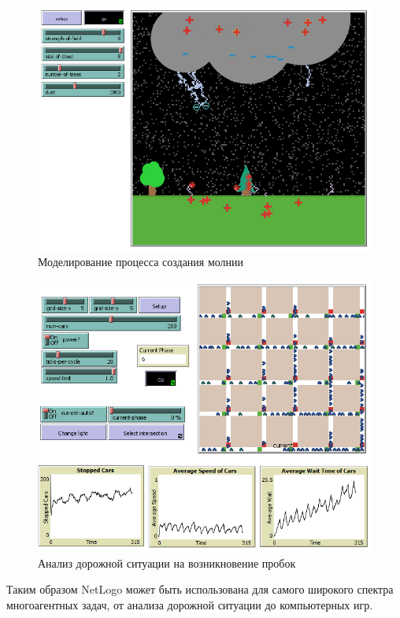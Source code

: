 \documentclass[14pt,a4paper,report]{report}
\begin{document}
\begin{figure}[h!]
	\centering
	\includegraphics[scale = 0.49]{images/8.png}
	\caption{Моделирование процесса создания молнии}
\end{figure}

\begin{figure}[h!]
	\centering
	\includegraphics[scale = 0.49]{images/9.png}
	\caption{Анализ дорожной ситуации на возникновение пробок}
\end{figure}

Таким образом NetLogo может быть использована для самого широкого спектра многоагентных задач, от анализа дорожной ситуации до компьютерных игр.
\end{document}
